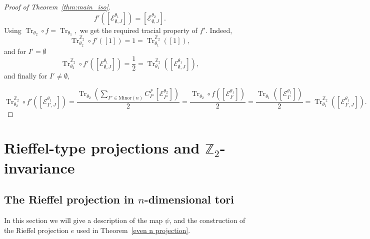 \documentclass[9pt, BCOR=2mm]{amsart}
\numberwithin{equation}{section}
\numberwithin{equation}{section}
\newcommand{\Z}{{\mathbb{Z}}}
\DeclareMathOperator{\Tr}{Tr}
\begin{document}
\begin{proof}[Proof of Theorem~\ref{thm:main_iso}]
$$f'([\mathcal{E}_{\emptyset,J}^{\theta_1}]) = [\mathcal{E}^{\theta_2}_{\emptyset,J}].$$  Using $\Tr_{\theta_{2}} \circ f=\Tr_{\theta_{1}},$ we get the required tracial property of $f'.$ Indeed, $$\Tr^{\Z_2
}_{\theta_{2}} \circ f' ([1])=1=\Tr^{\Z_2
}_{\theta_{1}}([1]),$$ and for $I'= \emptyset$
$$\Tr^{\Z_2
}_{\theta_{2}} \circ f' ([\mathcal{E}_{\emptyset,J}^{\theta_1}])=\frac{1}{2}=\Tr^{\Z_2
}_{\theta_{1}}([\mathcal{E}_{\emptyset,J}^{\theta_1}]),$$  and finally for $I'\neq \emptyset,$

$$\Tr^{\Z_2
}_{\theta_{2}} \circ f' ([\mathcal{E}_{I',J}^{\theta_1}])=\frac{\Tr_{\theta_2}(\sum_{I''\in \mathrm{Minor}(n)} C^{I'}_{I''}[\mathcal{E}^{\theta_2}_{I''}])}{2}=\frac{\Tr_{\theta_{2}} \circ f([\mathcal{E}^{\theta_1}_{I'}])}{2}=\frac{\Tr_{\theta_{1}}([\mathcal{E}^{\theta_1}_{I'}])}{2}=\Tr^{\Z_2
}_{\theta_{1}}([\mathcal{E}_{I',J}^{\theta_1}]).$$
 

\end{proof}

 
\appendix

\section{Rieffel-type projections and $\Z_2$-invariance}
\label{sec:riep}
\subsection{The Rieffel projection in $n$-dimensional tori}\label{sec:bottp} 
In this section we will give a description of the map $\psi$, and the construction of the Rieffel projection $e$ used in Theorem~\ref{even n projection}. 
\end{document}
